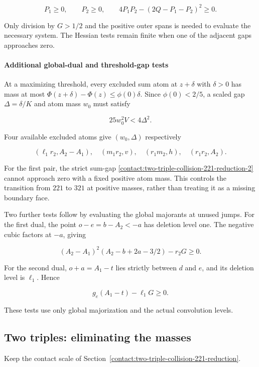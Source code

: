 \[
 \boxed{P_1\geq0,\qquad P_2\geq0,\qquad
 4P_1P_2-(2Q-P_1-P_2)^2\geq0.}
\tag{B.31.22}\label{contact:two-triple-collision-221-reduction-22}
\]

Only division by $G>1/2$ and the positive outer spans is needed to evaluate
the necessary system. The Hessian tests remain finite when one of
the adjacent gaps approaches zero.

\paragraph{Additional global-dual and threshold-gap tests}

At a maximizing threshold, every excluded sum atom at $z+\delta$ with
$\delta>0$ has mass at most $\Phi(z+\delta)-\Phi(z)\le \phi(0)\delta$.
Since $\phi(0)<2/5$, a scaled gap $\Delta=\delta/K$ and atom mass $w_0$
must satisfy

\[
 25w_0^2V<4\Delta^2.
\tag{B.31.23}\label{contact:two-triple-collision-221-reduction-23}
\]

Four available excluded atoms give $(w_0,\Delta)$ respectively

\[
 (\ell_1r_2,A_2-A_1),\quad (m_1r_2,v),
 \quad(r_1m_2,h),\quad(r_1r_2,A_2).
\]

For the first pair, the strict sum-gap \eqref{contact:two-triple-collision-221-reduction-2} cannot approach zero with a fixed
positive atom mass. This controls the transition from $221$ to $321$ at
positive masses, rather than treating it as a missing boundary face.

Two further tests follow by evaluating the global majorants at unused jumps.
For the first dual, the point $o-e=b-A_2<-a$ has deletion level one. The
negative cubic factors at $-a$, giving

\[
 \boxed{(A_2-A_1)^2(A_2-b+2a-3/2)-r_2G\geq0.}
\tag{B.31.24}\label{contact:two-triple-collision-221-reduction-24}
\]

For the second dual, $o+a=A_1-t$ lies strictly between $d$ and $e$,
and its deletion level is $\ell_1$. Hence

\[
 \boxed{g_e(A_1-t)-\ell_1G\geq0.}
\tag{B.31.25}\label{contact:two-triple-collision-221-reduction-25}
\]

These tests use only global majorization and the actual convolution levels.
\subsection{Two triples: eliminating the masses}\label{contact:two-triple-221-mass-elimination}
Keep the contact scale of Section~\ref{contact:two-triple-collision-221-reduction}.



